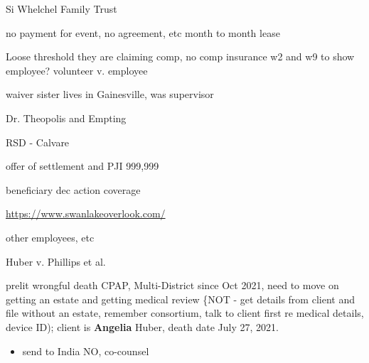 \documentclass[11pt]{article}
\begin{document}
Si  Whelchel Family Trust

no payment for event, no agreement, etc
month to month lease

Loose threshold
they are claiming comp, no comp insurance
w2 and w9 to show employee? volunteer v. employee

waiver
sister lives in Gainesville, was supervisor

Dr. Theopolis and Empting

RSD - Calvare

offer of settlement and PJI 999,999

beneficiary dec action coverage

\url{https://www.swanlakeoverlook.com/}

other employees, etc

Huber v. Phillips et al.

prelit wrongful death CPAP, Multi-District since Oct 2021, need to move on getting an estate and getting medical review \{NOT - get details from client and file without an estate, remember consortium, talk to client first re medical details, device ID); client is \textbf{Angelia} Huber, death date July 27, 2021.

\begin{itemize}
\item\relax [Huber] send to India NO, co-counsel
\end{itemize}
\end{document}
